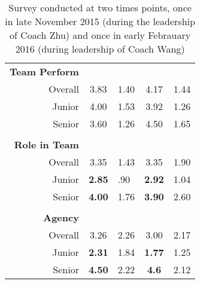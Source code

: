 \begin{table}[]
\begin{tabular}{@{}rclcl@{}}
\textbf{Team Perform}        &                         &         & \multicolumn{1}{l}{}    &         \\
Overall                      & 3.83                    & 1.40    & 4.17                    & 1.44    \\
Junior                       & 4.00                    & 1.53    & 3.92                    & 1.26    \\
Senior                       & 3.60                    & 1.26    & 4.50                    & 1.65    \\
\multicolumn{1}{l}{}         &                         &         &                         &         \\
\textbf{Role in Team}        &                         &         &                         &         \\
Overall                      & 3.35                    & 1.43    & 3.35                    & 1.90    \\
Junior                       & \textbf{2.85}           & .90     & \textbf{2.92}           & 1.04    \\
Senior                       & \textbf{4.00}           & 1.76    & \textbf{3.90}           & 2.60    \\
\multicolumn{1}{l}{}         & \multicolumn{1}{l}{}    &         & \multicolumn{1}{l}{}    &         \\
\textbf{Agency}              & \multicolumn{1}{l}{}    &         & \multicolumn{1}{l}{}    &         \\
Overall                      & 3.26                    & 2.26    & 3.00                    & 2.17    \\
Junior                       & \textbf{2.31}           & 1.84    & \textbf{1.77}           & 1.25    \\
Senior                       & \textbf{4.50}           & 2.22    & \textbf{4.6}            & 2.12    \\ \bottomrule
\end{tabular}
\caption{Survey conducted at two times points, once in late November 2015 (during the leadership of Coach Zhu) and once in early Febrauary 2016 (during leadership of Coach Wang)}
\label{tab:groupMemBooktab}
\end{table}